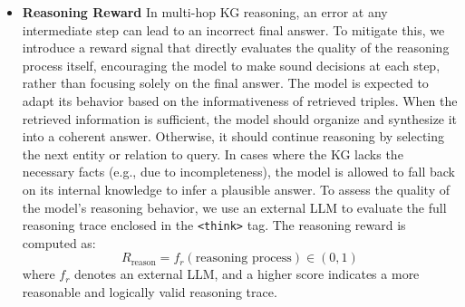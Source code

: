 \documentclass[10pt,conference]{IEEEtran}
\begin{document}
\begin{itemize}[leftmargin=1.5em]
\item \textbf{Reasoning Reward}
In multi-hop KG reasoning, an error at any intermediate step can lead to an incorrect final answer.  To mitigate this, we introduce a reward signal that directly evaluates the quality of the reasoning process itself, encouraging the model to make sound decisions at each step, rather than focusing solely on the final answer.
The model is expected to adapt its behavior based on the informativeness of retrieved triples. When the retrieved information is sufficient, the model should organize and synthesize it into a coherent answer. Otherwise, it should continue reasoning by selecting the next entity or relation to query. In cases where the KG lacks the necessary facts (e.g., due to incompleteness), the model is allowed to fall back on its internal knowledge to infer a plausible answer.
To assess the quality of the model’s reasoning behavior, we use an external LLM to evaluate the full reasoning trace enclosed in the \texttt{<think>} tag. %
The reasoning reward is computed as:
\begin{equation}
R_{\text{reason}} = f_r(\text{reasoning process}) \in (0, 1)
\label{eq:reason}
\end{equation}
where $f_r$ denotes an external LLM, and a higher score indicates a more reasonable and logically valid reasoning trace.


\end{itemize}
\end{document}
